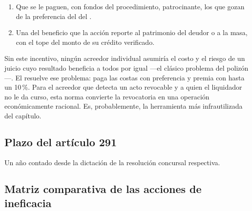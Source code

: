 \begin{enumerate}
  \item Que se le paguen, con fondos del procedimiento,  patrocinante, los que gozan de la preferencia del
   del .
  \item Una  del beneficio que la acción reporte al
  patrimonio del deudor o a la masa, con el tope del monto de su crédito verificado.
\end{enumerate}

\begin{foco}
Sin este incentivo, ningún acreedor individual asumiría el costo y el riesgo de un juicio cuyo
resultado beneficia a todos por igual ---el clásico problema del polizón---. El 
resuelve ese problema: paga las costas con preferencia y premia con hasta un 10\,\%. Para el
acreedor que detecta un acto revocable y a quien el liquidador no le da curso, esta norma
convierte la revocatoria en una operación económicamente racional. Es, probablemente, la
herramienta más infrautilizada del capítulo.
\end{foco}

\subsection{Plazo del artículo 291}

Un año contado desde la dictación de la resolución concursal respectiva.

\bloquePractico

\subsection{Matriz comparativa de las acciones de ineficacia}


